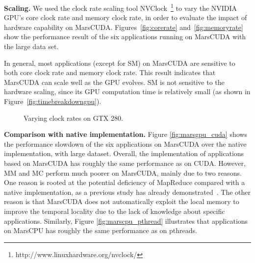 {\bf Scaling.} We used the clock rate scaling tool
NVClock~\footnote{http://www.linuxhardware.org/nvclock/} to vary the
NVIDIA GPU's core clock rate and memory clock rate, in order to
evaluate the impact of hardware capability on MarsCUDA. Figures~\ref{fig:corerate} and~\ref{fig:memoryrate} show the
performance result of the six applications running on MarsCUDA with
the large data set.

In general, most applications (except for SM) on MarsCUDA are
sensitive to both core clock rate and memory clock rate.
This result indicates that MarsCUDA can scale well as the GPU evolves.
SM is not sensitive to the hardware scaling, since its GPU computation time is relatively small (as shown in Figure~\ref{fig:timebreakdowngpu}).

\begin{figure}[ht]
\centerline{  \hfill {} } \caption{Varying clock rates on GTX 280.} \label{fig:freq}
\end{figure}

{\bf Comparison with native implementation.}
Figure \ref{fig:marsgpu_cuda} shows the performance slowdown of the six applications on MarsCUDA over the native implementation, with large dataset.
Overall, the implementation of applications based on MarsCUDA has roughly the same performance as on CUDA.
However, MM and MC perform much poorer on MarsCUDA, mainly due to two reasons.
One reason is rooted at the potential deficiency of MapReduce compared with a native implementation, as a previous study has already demonstrated~\cite{Ranger2007}. The other reason is that MarsCUDA does not automatically exploit the local memory to improve the temporal locality due to the lack of knowledge about specific applications.
Similarly, Figure \ref{fig:marscpu_pthread} illustrates that applications on MarsCPU has roughly the same performance as on pthreads.

